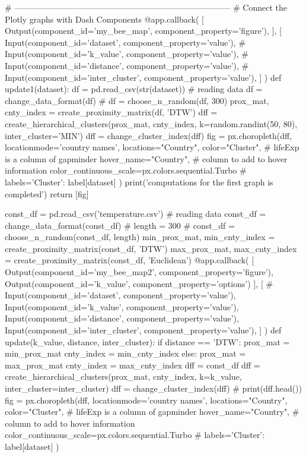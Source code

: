 {{{{# ------------------------------------------------------------------------------
# Connect the Plotly graphs with Dash Components
@app.callback(
    [
        Output(component_id='my_bee_map', component_property='figure'),
     ],
    [
        Input(component_id='dataset', component_property='value'),
        # Input(component_id='k_value', component_property='value'),
        # Input(component_id='distance', component_property='value'),
        # Input(component_id='inter_cluster', component_property='value'),
    ]
)
def update1(dataset):
    df = pd.read_csv(str(dataset))                      # reading data
    df = change_data_format(df)
    # df = choose_n_random(df, 300)
    prox_mat, cnty_index = create_proximity_matrix(df, 'DTW')
    dff = create_hierarchical_clusters(prox_mat, cnty_index, k=random.randint(50, 80), inter_cluster='MIN')
    dff = change_cluster_index(dff)
    fig = px.choropleth(dff,
                        locationmode='country names',
                        locations="Country",
                        color="Cluster",  # lifeExp is a column of gapminder
                        hover_name="Country",  # column to add to hover information
                        color_continuous_scale=px.colors.sequential.Turbo
                        # labels={'Cluster': label[dataset]}
    )
    print('computations for the first graph is completed')
    return [fig]

const_df = pd.read_csv('temperature.csv')                      # reading data
const_df = change_data_format(const_df)
# length = 300
# const_df = choose_n_random(const_df, length)
min_prox_mat, min_cnty_index = create_proximity_matrix(const_df, 'DTW')
max_prox_mat, max_cnty_index = create_proximity_matrix(const_df, 'Euclidean')
@app.callback(
    [
        Output(component_id='my_bee_map2', component_property='figure'),
        Output(component_id='k_value', component_property='options')
     ],
    [
        # Input(component_id='dataset', component_property='value'),
        Input(component_id='k_value', component_property='value'),
        Input(component_id='distance', component_property='value'),
        Input(component_id='inter_cluster', component_property='value'),
    ]
)
def update(k_value, distance, inter_cluster):
    if distance == 'DTW':
        prox_mat = min_prox_mat
        cnty_index = min_cnty_index
    else:
        prox_mat = max_prox_mat
        cnty_index = max_cnty_index
    dff = const_df
    dff = create_hierarchical_clusters(prox_mat, cnty_index, k=k_value, inter_cluster=inter_cluster)
    dff = change_cluster_index(dff)
    # print(dff.head())
    fig = px.choropleth(dff,
                        locationmode='country names',
                        locations="Country",
                        color="Cluster",  # lifeExp is a column of gapminder
                        hover_name="Country",  # column to add to hover information
                        color_continuous_scale=px.colors.sequential.Turbo
                        # labels={'Cluster': label[dataset]}
    )

}}}}
